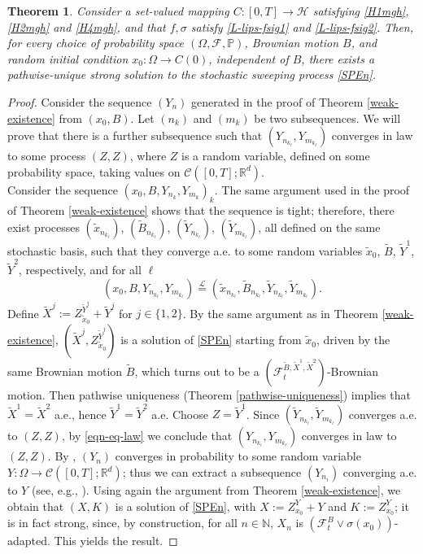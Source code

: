 \documentclass[preprint,12pt]{elsarticle}
\renewcommand{\H}{\mathcal{H}}
\newcommand{\R}{\mathbb{R}}
\newcommand{\N}{\mathbb{N}}
\theoremstyle{plain}
\newtheorem{theorem}{Theorem}[section]
\theoremstyle{definition}
\theoremstyle{remark}
\begin{document}
\begin{theorem}\label{thm-strong-existence}
Consider a set-valued mapping $C\colon [0,T]\to \H$ satisfying \ref{H1mgh}, \ref{H2mgh} and \ref{H4mgh}, and that $f,\sigma$ satisfy \eqref{L-lips-fsig1} and \eqref{L-lips-fsig2}. Then, for every choice of probability space $(\Omega,\mathcal{F},\mathbb{P})$, Brownian motion $B$, and random initial condition $x_0\colon \Omega\to C(0)$, independent of $B$, there exists a pathwise-unique strong solution to the stochastic sweeping process \eqref{SPEn}.
	\end{theorem}
	\begin{proof}
Consider the sequence $(Y_n)$ generated in the proof of Theorem \ref{weak-existence} from $(x_0,B)$. Let $(n_k)$ and $(m_k)$ be two subsequences. We will prove that there is a further subsequence such that $(Y_{n_{k_\ell}},Y_{m_{k_\ell}})$ converges in law to some process $(Z,Z)$,  where $Z$ is a random variable, defined on some probability space, taking values on $\mathcal{C}([0,T];\R^d)$.\\
Consider the sequence $(x_0,B,Y_{n_{k}},Y_{m_{k}})_k$. The same argument used in the proof of Theorem \ref{weak-existence} shows that the sequence is tight;  therefore, there exist processes  $(\tilde{x}_{n_{k_\ell}})$, $(\tilde{B}_{n_{k_\ell}})$, $(\tilde{Y}_{n_{k_\ell}})$, $(\tilde{Y}_{m_{k_\ell}})$, all defined on the same stochastic basis, such that they converge a.e. to some random variables $\tilde{x}_0$, $\tilde{B}$, $\tilde{Y}^1$, $\tilde{Y}^{2}$, respectively, and for all $\ell$ 
 	\begin{equation}\label{eqn-eq-law}
 		(x_0,B,Y_{n_{k_\ell}},Y_{m_{k_\ell}}) \stackrel{\mathscr{L}}{=} (\tilde{x}_{n_{k_\ell}},\tilde{B}_{n_{k_\ell}},\tilde{Y}_{n_{k_\ell}},\tilde{Y}_{m_{k_\ell}}).
 	\end{equation}
 Define $\tilde{X}^j := Z^{\tilde{Y}^{j}}_{\tilde{x}_0} + \tilde{Y}^j$ for $j\in \{1,2\}$. By the same argument as in Theorem \ref{weak-existence}, $(\tilde{X}^j,Z^{\tilde{Y}^{j}}_{\tilde{x}_0})$ is a solution of \eqref{SPEn} starting from $\tilde{x}_0$, driven by the same Brownian motion $\tilde{B}$, which turns out to be a $(\mathcal{F}_t^{\tilde{B},\tilde{X}^1,\tilde{X}^2})$-Brownian motion. Then  pathwise uniqueness (Theorem \ref{pathwise-uniqueness}) implies that  $\tilde{X}^1 = \tilde{X}^2$ a.e., hence  $\tilde{Y}^1 = \tilde{Y}^2$ a.e. Choose $Z = \tilde{Y}^1$. Since $(\tilde{Y}_{n_{k_\ell}},\tilde{Y}_{m_{k_\ell}})$ converges a.e. to $(Z,Z)$, by \eqref{eqn-eq-law} we conclude that $(Y_{n_{k_\ell}}, Y_{m_{k_\ell}})$ converges in law to $(Z,Z)$. By \cite[Lemma 1.1]{MR1392450}, $(Y_n)$ converges in probability to some random variable $Y\colon \Omega\to \mathcal{C}([0,T];\R^d)$; thus we can extract a subsequence $(Y_{n_i})$ converging a.e. to $Y$ (see, e.g., \cite[Theorem 9.2.1]{MR1932358}). Using again the argument from Theorem \ref{weak-existence}, we obtain that $(X,K)$ is a solution of \eqref{SPEn}, with $X := Z^Y_{x_0} + Y$ and $K:=Z^Y_{x_0}$; it is in fact strong, since,  by construction, for all $n\in \N$, $X_n$ is $(\mathcal{F}^B_t\vee \sigma(x_0))$-adapted. This yields the result.
	\end{proof}
\end{document}
